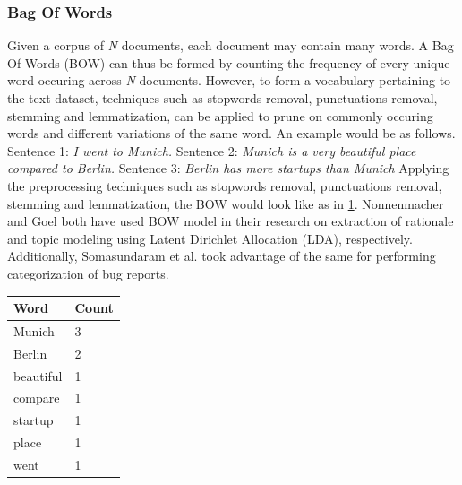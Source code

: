 \documentclass[a4paper,12pt,twoside]{report}
\begin{document}
\subsubsection{Bag Of Words}
Given a corpus of \textit{N} documents, each document may contain many words. A Bag Of Words (\acs{BOW}) can thus be formed by counting the frequency of every unique word occuring across \textit{N} documents. However, to form a vocabulary pertaining to the text dataset, techniques such as stopwords removal, punctuations removal, stemming and lemmatization, can be applied to prune on commonly occuring words and different variations of the same word. An example would be as follows.
\newline \newline
Sentence 1: \textit{I went to Munich.}
\newline \newline
Sentence 2: \textit{Munich is a very beautiful place compared to Berlin.}
\newline \newline
Sentence 3: \textit{Berlin has more startups than Munich}
\newline \newline
Applying the preprocessing techniques such as stopwords removal, punctuations removal, stemming and lemmatization, the \acs{BOW} would look like as in \ref{tab:bowExample}. Nonnenmacher\cite{Nonnenmacher2017} and Goel \cite{Goel2017} both have used \acs{BOW} model in their research on extraction of rationale and topic modeling using Latent Dirichlet Allocation (\acs{LDA}), respectively. Additionally, Somasundaram et al. \cite{Somasundaram2012} took advantage of the same for performing categorization of bug reports.
\begin{table} %
    \centering
    \begin{adjustbox}{max width=\columnwidth}
    \def\arraystretch{1} %
    \begin{tabular}{p{2cm} p{2cm}}
        \toprule
        \textbf{Word} & \textbf{Count}\\
        \midrule
			Munich & 3 \\
			Berlin & 2 \\ 
			beautiful & 1 \\ 
			compare & 1 \\ 
			startup & 1 \\
			place & 1 \\ 
			went & 1 \\
        \midrule
    \end{tabular}
    \end{adjustbox}
    \label{tab:bowExample}
\end{table}
\end{document}
